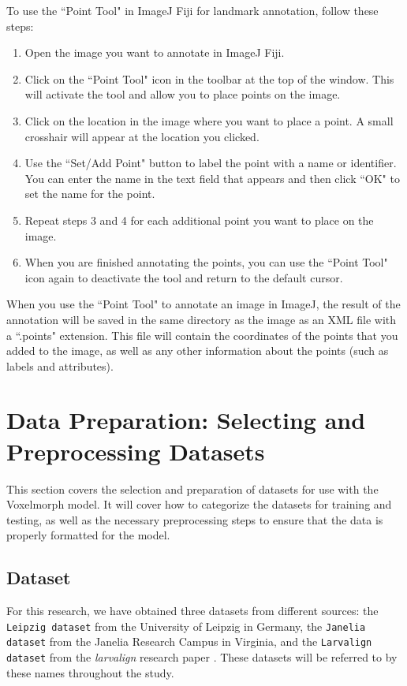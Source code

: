 \documentclass{book}
\begin{document}
	To use the ``Point Tool" in ImageJ Fiji for landmark annotation, follow these steps:
	\begin{enumerate}
		\item Open the image you want to annotate in ImageJ Fiji.
		\item Click on the ``Point Tool" icon in the toolbar at the top of the window. This will activate the tool and allow you to place points on the image.
		\item Click on the location in the image where you want to place a point. A small crosshair will appear at the location you clicked.
		\item Use the ``Set/Add Point" button to label the point with a name or identifier. You can enter the name in the text field that appears and then click ``OK" to set the name for the point.
		\item Repeat steps 3 and 4 for each additional point you want to place on the image.
		\item When you are finished annotating the points, you can use the ``Point Tool" icon again to deactivate the tool and return to the default cursor.
	\end{enumerate}

	When you use the ``Point Tool" to annotate an image in ImageJ, the result of the annotation will be saved in the same directory as the image as an XML file with a ``.points" extension. This file will contain the coordinates of the points that you added to the image, as well as any other information about the points (such as labels and attributes).
	
	\section{Data Preparation: Selecting and Preprocessing Datasets}
	This section covers the selection and preparation of datasets for use with the Voxelmorph model. It will cover how to categorize the datasets for training and testing, as well as the necessary preprocessing steps to ensure that the data is properly formatted for the model.
	
	\subsection{Dataset}
	For this research, we have obtained three datasets from different sources: the \texttt{Leipzig dataset} from the University of Leipzig in Germany, the \texttt{Janelia dataset} from the Janelia Research Campus in Virginia, and the \texttt{Larvalign dataset} from the \textit{larvalign} research paper \cite{larvalign}. These datasets will be referred to by these names throughout the study.
	
\end{document}
